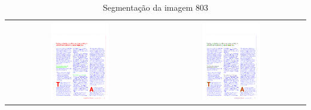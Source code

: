 \documentclass[a4paper,11pt]{article}
\begin{document}
    \begin{table}[p]
      \caption{Segmentação da imagem 803}
      \begin{center}
        \begin{tabular}{ c c }
        \includegraphics[width=0.4\textwidth]{assets/final_ideal/cacm_803_ideal.png}
        &
        \includegraphics[width=0.4\textwidth]{assets/result_imagens/cacm_50_percent_sparse_9x9_803_final.png}
        \end{tabular}
      \end{center}
      \label{tab:segmentation_803}
    \end{table}

\end{document}
